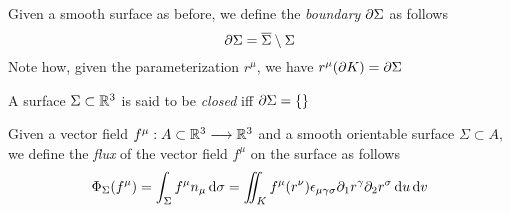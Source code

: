 \documentclass[../complete.tex]{subfiles}
\begin{document}
\begin{dfn}
	Given a smooth surface as before, we define the \textit{boundary} $\partial\Sigma$ as follows
	\begin{equation}
		\partial\Sigma=\overline{\Sigma}\setminus\Sigma
		\label{eq:boundarysurf}
	\end{equation}
	Note how, given the parameterization $r^\mu$, we have $r^\mu(\partial K)=\partial\Sigma$
\end{dfn}
\begin{dfn}
	A surface $\Sigma\subset\mathbb{R}^3$ is said to be \textit{closed} iff $\partial\Sigma=\{\}$
\end{dfn}
\begin{dfn}[Flux]
	Given a vector field $f^\mu:A\subset\mathbb{R}^3\overset{}{\longrightarrow}\mathbb{R}^3$ and a smooth orientable surface $\Sigma\subset A$, we define the \textit{flux} of the vector field $f^\mu$ on the surface as follows
	\begin{equation}
		\Phi_\Sigma(f^\mu)=\int_\Sigma f^\mu n_\mu\operatorname{d\!}\sigma=\iint_Kf^\mu(r^\nu)\epsilon_{\mu\gamma\sigma}\partial_1r^\gamma\partial_2r^\sigma\operatorname{d\!} u\operatorname{d\!} v
		\label{eq:flux}
	\end{equation}
\end{dfn}
\end{document}
